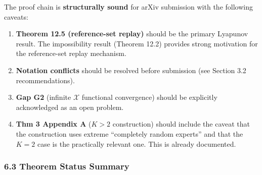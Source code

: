 \documentclass[
  12pt,
]{ctexart}
\begin{document}
The proof chain is \textbf{structurally sound} for arXiv submission with
the following caveats:

\begin{enumerate}
\def\labelenumi{\arabic{enumi}.}
\item
  \textbf{Theorem 12.5 (reference-set replay)} should be the primary
  Lyapunov result. The impossibility result (Theorem 12.2) provides
  strong motivation for the reference-set replay mechanism.
\item
  \textbf{Notation conflicts} should be resolved before submission (see
  Section 3.2 recommendations).
\item
  \textbf{Gap G2} (infinite \(\mathcal{X}\) functional convergence)
  should be explicitly acknowledged as an open problem.
\item
  \textbf{Thm 3 Appendix A} (\(K>2\) construction) should include the
  caveat that the construction uses extreme ``completely random
  experts'' and that the \(K=2\) case is the practically relevant one.
  This is already documented.
\end{enumerate}

\subsubsection{6.3 Theorem Status Summary}\label{theorem-status-summary}
\end{document}
